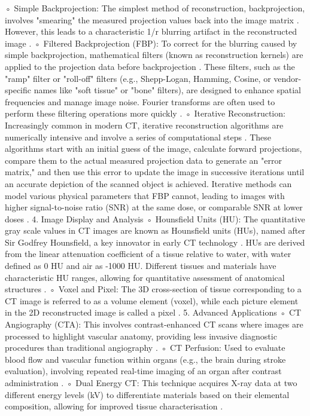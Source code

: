 \begin{enumerate}
    ◦ Simple Backprojection: The simplest method of reconstruction, backprojection, involves "smearing" the measured projection values back into the image matrix
. However, this leads to a characteristic 1/r blurring artifact in the reconstructed image
.
    ◦ Filtered Backprojection (FBP): To correct for the blurring caused by simple backprojection, mathematical filters (known as reconstruction kernels) are applied to the projection data before backprojection
. These filters, such as the "ramp" filter or "roll-off" filters (e.g., Shepp-Logan, Hamming, Cosine, or vendor-specific names like "soft tissue" or "bone" filters), are designed to enhance spatial frequencies and manage image noise. Fourier transforms are often used to perform these filtering operations more quickly
.
    ◦ Iterative Reconstruction: Increasingly common in modern CT, iterative reconstruction algorithms are numerically intensive and involve a series of computational steps
. These algorithms start with an initial guess of the image, calculate forward projections, compare them to the actual measured projection data to generate an "error matrix," and then use this error to update the image in successive iterations until an accurate depiction of the scanned object is achieved. Iterative methods can model various physical parameters that FBP cannot, leading to images with higher signal-to-noise ratio (SNR) at the same dose, or comparable SNR at lower doses
.
4. Image Display and Analysis
    ◦ Hounsfield Units (HU): The quantitative gray scale values in CT images are known as Hounsfield units (HUs), named after Sir Godfrey Hounsfield, a key innovator in early CT technology
. HUs are derived from the linear attenuation coefficient of a tissue relative to water, with water defined as 0 HU and air as -1000 HU. Different tissues and materials have characteristic HU ranges, allowing for quantitative assessment of anatomical structures
.
    ◦ Voxel and Pixel: The 3D cross-section of tissue corresponding to a CT image is referred to as a volume element (voxel), while each picture element in the 2D reconstructed image is called a pixel
.
5. Advanced Applications
    ◦ CT Angiography (CTA): This involves contrast-enhanced CT scans where images are processed to highlight vascular anatomy, providing less invasive diagnostic procedures than traditional angiography
.
    ◦ CT Perfusion: Used to evaluate blood flow and vascular function within organs (e.g., the brain during stroke evaluation), involving repeated real-time imaging of an organ after contrast administration
.
    ◦ Dual Energy CT: This technique acquires X-ray data at two different energy levels (kV) to differentiate materials based on their elemental composition, allowing for improved tissue characterisation
.


\end{enumerate}
